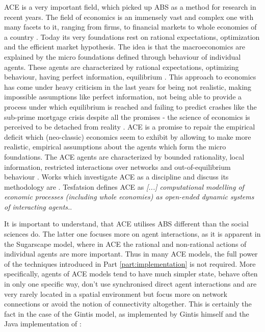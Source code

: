 ACE is a very important field, which picked up ABS as a method for research in recent years. The field of economics is an immensely vast and complex one with many facets to it, ranging from firms, to financial markets to whole economies of a country \cite{bowles_understanding_2005}. Today its very foundations rest on rational expectations, optimization and the efficient market hypothesis. The idea is that the macroeconomics are explained by the micro foundations \cite{colell_microeconomic_1995} defined through behaviour of individual agents. These agents are characterized by rational expectations, optimizing behaviour, having perfect information, equilibrium \cite{focardi_is_2015}.
This approach to economics has come under heavy criticism in the last years for being not realistic, making impossible assumptions like perfect information, not being able to provide a process under which equilibrium is reached \cite{kirman_complex_2010} and failing to predict crashes like the sub-prime mortgage crisis despite all the promises - the science of economics is perceived to be detached from reality \cite{focardi_is_2015}. 
ACE is a promise to repair the empirical deficit which (neo-classic) economics seem to exhibit by allowing to make more realistic, empirical assumptions about the agents which form the micro foundations. The ACE agents are characterized by bounded rationality, local information, restricted interactions over networks and out-of-equilibrium behaviour \cite{farmer_economy_2009}. 
Works which investigate ACE as a discipline and discuss its methodology are \cite{ballot_agent-based_2015,blume_introduction_2015,richiardi_agent-based_2007,tesfatsion_agent-based_2006}.
Tesfatsion \cite{tesfatsion_agent-based_2017} defines ACE as \textit{[...] computational modelling of economic processes (including whole economies) as open-ended dynamic systems of interacting agents.}. 

It is important to understand, that ACE utilises ABS different than the social sciences do. The latter one focuses more on agent interactions, as it is apparent in the Sugarscape model, where in ACE the rational and non-rational actions of individual agents are more important. Thus in many ACE models, the full power of the techniques introduced in Part \ref{part:implementation} is not required. More specifically, agents of ACE models tend to have much simpler state, behave often in only one specific way, don't use synchronised direct agent interactions and are very rarely located in a spatial environment but focus more on network connections \cite{glasserman_contagion_2015,wilhite_economic_2006} or avoid the notion of connectivity altogether. This is certainly the fact in the case of the Gintis model, as implemented by Gintis himself and the Java implementation of \cite{evensen_extensible_2010}: 

